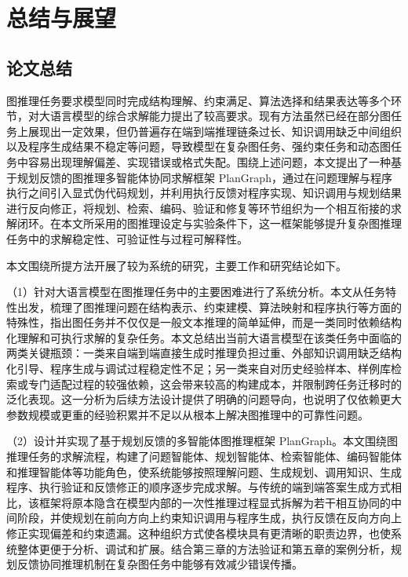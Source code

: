 \chapter{总结与展望}
\label{chp:conclusion}

\section{论文总结}

图推理任务要求模型同时完成结构理解、约束满足、算法选择和结果表达等多个环节，对大语言模型的综合求解能力提出了较高要求。现有方法虽然已经在部分图任务上展现出一定效果，但仍普遍存在端到端推理链条过长、知识调用缺乏中间组织以及程序生成结果不稳定等问题，导致模型在复杂图任务、强约束任务和动态图任务中容易出现理解偏差、实现错误或格式失配。围绕上述问题，本文提出了一种基于规划反馈的图推理多智能体协同求解框架 PlanGraph，通过在问题理解与程序执行之间引入显式伪代码规划，并利用执行反馈对程序实现、知识调用与规划结果进行反向修正，将规划、检索、编码、验证和修复等环节组织为一个相互衔接的求解闭环。在本文所采用的图推理设定与实验条件下，这一框架能够提升复杂图推理任务中的求解稳定性、可验证性与过程可解释性。

本文围绕所提方法开展了较为系统的研究，主要工作和研究结论如下。

（1）针对大语言模型在图推理任务中的主要困难进行了系统分析。本文从任务特性出发，梳理了图推理问题在结构表示、约束建模、算法映射和程序执行等方面的特殊性，指出图任务并不仅仅是一般文本推理的简单延伸，而是一类同时依赖结构化理解和可执行求解的复杂任务。本文总结出当前大语言模型在该类任务中面临的两类关键瓶颈：一类来自端到端直接生成时推理负担过重、外部知识调用缺乏结构化引导、程序生成与调试过程稳定性不足；另一类来自对历史经验样本、样例库检索或专门适配过程的较强依赖，这会带来较高的构建成本，并限制跨任务迁移时的泛化表现。这一分析为后续方法设计提供了明确的问题导向，也说明了仅依赖更大参数规模或更重的经验积累并不足以从根本上解决图推理中的可靠性问题。

（2）设计并实现了基于规划反馈的多智能体图推理框架 PlanGraph。本文围绕图推理任务的求解流程，构建了问题智能体、规划智能体、检索智能体、编码智能体和推理智能体等功能角色，使系统能够按照理解问题、生成规划、调用知识、生成程序、执行验证和反馈修正的顺序逐步完成求解。与传统的端到端答案生成方式相比，该框架将原本隐含在模型内部的一次性推理过程显式拆解为若干相互协同的中间阶段，并使规划在前向方向上约束知识调用与程序生成，执行反馈在反向方向上修正实现偏差和约束遗漏。这种组织方式使各模块具有更清晰的职责边界，也使系统整体更便于分析、调试和扩展。结合第三章的方法验证和第五章的案例分析，规划反馈协同推理机制在复杂图任务中能够有效减少错误传播。

